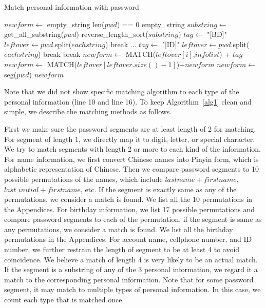 \documentclass{sig-alternate}
\begin{document}
\begin{algorithm}[h!]
\caption{Match personal information with password}
\label{alg1}
\begin{algorithmic}[1]
\State $newform \gets$ empty\_string
\If len($pwd$) == 0
\State \Return empty\_string
\EndIf
\State $substring \gets$ get\_all\_substring($pwd$)
\State reverse\_length\_sort($substring$)
\State $tag \gets $ "[BD]"
\State $leftover \gets pwd$.split($eachstring$)
\State break
\EndIf
\State $\ldots$
\State $tag \gets$ "[ID]"
\State $leftover \gets pwd$.split($eachstring$)
\State break
\EndIf
\Else
\State break
\EndIf
\EndFor
{}
\State $newform \gets$ MATCH($leftover[i]$,$infolist$) + $tag$
\EndFor
\State $newform \gets$  MATCH($leftover[leftover.size()-1]$)+$newform$
\Else
\State $newform \gets$ seg($pwd$)
\EndIf
\State \Return $newform$
\EndProcedure
\end{algorithmic}
\end{algorithm}

Note that we did not show specific matching algorithm to each type of the personal information (line 10 and line 16). To keep Algorithm~\ref{alg1} clean and simple, we describe the matching methods as follows.

First we make sure the password segments are at least length of 2 for matching. For segment of length 1, we directly map it to digit, letter, or special character. We try to match segments with length 2 or more to each kind of the information. For name information, we first convert Chinese names into Pinyin form, which is alphabetic representation of Chinese. Then we compare password segments to 10 possible permutations of the names, which include $lastname + firstname$, $last\_initial+firstname$, etc. If the segment is exactly same as any of the permutations, we consider a match is found. We list all the 10 permutations in the Appendices. For birthday information, we list 17 possible permutations and compare password segments to each of the permutation, if the segment is same as any permutations, we consider a match is found. We list all the birthday permutations in the Appendices. For account name, cellphone number, and ID number, we further restrain the length of segment to be at least 4 to avoid coincidence. We believe a match of length 4 is very likely to be an actual match. If the segment is a substring of any of the 3 personal information, we regard it a match to the corresponding personal information. Note that for some password segment, it may match to multiple types of personal information. In this case, we count each type that is matched once.
\end{document}
